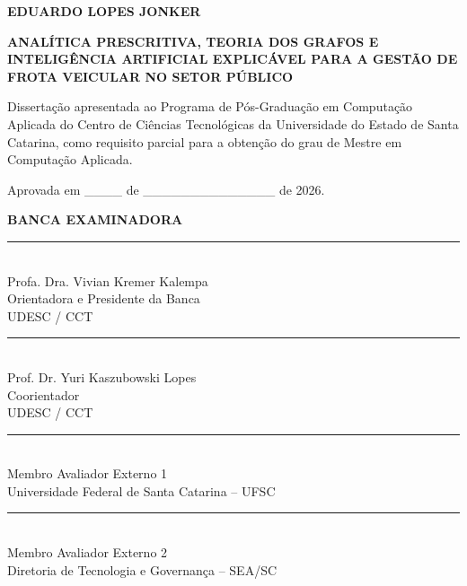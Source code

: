 \begin{folhadeaprovacao}
    \center
    {\ABNTEXchapterfont\bfseries\large EDUARDO LOPES JONKER\par}
    
    \vspace{2cm}
    \begin{center}
        {\ABNTEXchapterfont\bfseries\Large ANALÍTICA PRESCRITIVA, TEORIA DOS GRAFOS E INTELIGÊNCIA ARTIFICIAL EXPLICÁVEL PARA A GESTÃO DE FROTA VEICULAR NO SETOR PÚBLICO\par}
    \end{center}
    
    \vspace{1.5cm}
    \hspace{.45\textwidth}
    \begin{minipage}{.5\textwidth}
        \SingleSpacing
        \small
        Dissertação apresentada ao Programa de Pós-Graduação em Computação Aplicada do Centro de Ciências Tecnológicas da Universidade do Estado de Santa Catarina, como requisito parcial para a obtenção do grau de Mestre em Computação Aplicada.
    \end{minipage}
    
    \vspace{1.5cm}
    \noindent Aprovada em \_\_\_\_ de \_\_\_\_\_\_\_\_\_\_\_\_\_\_ de 2026.
    
    \vspace{1.5cm}
    \textbf{BANCA EXAMINADORA}
    
    \vspace{1.5cm}
    \begin{center}
        \rule{10cm}{0.4pt}\\
        Profa. Dra. Vivian Kremer Kalempa\\
        Orientadora e Presidente da Banca\\
        UDESC / CCT
        
        \vspace{1.0cm}
        \rule{10cm}{0.4pt}\\
        Prof. Dr. Yuri Kaszubowski Lopes\\
        Coorientador\\
        UDESC / CCT
        
        \vspace{1.0cm}
        \rule{10cm}{0.4pt}\\
        Membro Avaliador Externo 1\\
        Universidade Federal de Santa Catarina -- UFSC
        
        \vspace{1.0cm}
        \rule{10cm}{0.4pt}\\
        Membro Avaliador Externo 2\\
        Diretoria de Tecnologia e Governança -- SEA/SC
    \end{center}
\end{folhadeaprovacao}
